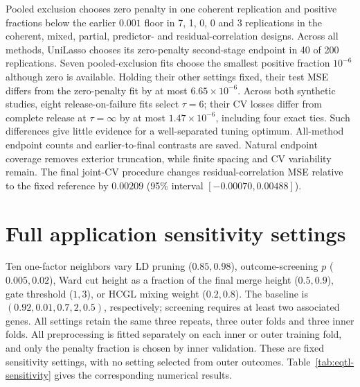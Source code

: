 \documentclass[11pt,a4paper]{article}
\begin{document}
Pooled exclusion chooses zero penalty in one coherent replication and positive
fractions below the earlier $0.001$ floor in 7, 1, 0, 0 and 3 replications in
the coherent, mixed, partial, predictor- and residual-correlation designs.
Across all methods, UniLasso chooses its zero-penalty second-stage endpoint in
40 of 200 replications. Seven pooled-exclusion fits choose the smallest positive
fraction $10^{-6}$ although zero is available. Holding their other settings fixed,
their test MSE differs from the zero-penalty fit by at most $6.65\times10^{-6}$.
Across both synthetic studies, eight release-on-failure fits select $\tau=6$;
their CV losses differ from complete release at $\tau=\infty$ by at most
$1.47\times10^{-6}$, including four exact ties. Such differences give little
evidence for a well-separated tuning optimum. All-method endpoint counts and
earlier-to-final contrasts are saved. Natural endpoint coverage removes exterior
truncation, while finite spacing and CV variability remain. The final joint-CV
procedure changes residual-correlation MSE relative to the fixed reference by
$0.00209$ (95\% interval $[-0.00070,0.00488]$).

\FloatBarrier

\section{Full application sensitivity settings}\label{app:eqtl-settings}
Ten one-factor neighbors vary LD pruning ($0.85,0.98$), outcome-screening $p$ ($0.005,0.02$), Ward cut height as a fraction of the final merge height ($0.5,0.9$), gate threshold ($1,3$), or HCGL mixing weight ($0.2,0.8$). The baseline is $(0.92,0.01,0.7,2,0.5)$, respectively; screening requires at least two associated genes. All settings retain the same three repeats, three outer folds and three inner folds. All preprocessing is fitted separately on each inner or outer training fold, and only the penalty fraction is chosen by inner validation. These are fixed sensitivity settings, with no setting selected from outer outcomes.
\noindent Table~\ref{tab:eqtl-sensitivity} gives the corresponding numerical results.
\end{document}

